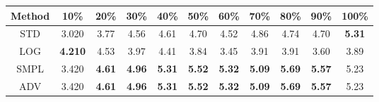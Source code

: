 \documentclass{standalone}
\begin{document}
\begin{tabular}{c|cccccccccc}
      \toprule
      Method & 10\% & 20\% & 30\% & 40\% & 50\% & 60\% & 70\% & 80\% & 90\% & 100\% \\
      \midrule
STD & 3.020 & 3.77 & 4.56 & 4.61 & 4.70 & 4.52 & 4.86 & 4.74 & 4.70 & \textbf{5.31}\\
LOG & \textbf{4.210} & 4.53 & 3.97 & 4.41 & 3.84 & 3.45 & 3.91 & 3.91 & 3.60 & 3.89\\
SMPL & 3.420 & \textbf{4.61} & \textbf{4.96} & \textbf{5.31} & \textbf{5.52} & \textbf{5.32} & \textbf{5.09} & \textbf{5.69} & \textbf{5.57} & 5.23\\
ADV & 3.420 & \textbf{4.61} & \textbf{4.96} & \textbf{5.31} & \textbf{5.52} & \textbf{5.32} & \textbf{5.09} & \textbf{5.69} & \textbf{5.57} & 5.23\\
  \bottomrule
\end{tabular}
\end{document}
